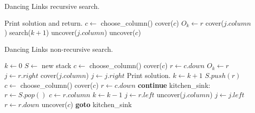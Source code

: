 \documentclass[a4paper]{article}
\begin{document}
\begin{algorithm}[p]
	\caption{Dancing Links recursive search.}
	\label{alg:search}
	\begin{distribalgo}[1]
				\STATE Print solution and return.  
			\ENDIF
			\STATE $c \leftarrow$ choose\_column()
			\STATE cover($c$)
				\STATE $O_k \leftarrow r$  
					\STATE cover($j.column$)
				\ENDFOR
				\STATE search($k + 1$)
					\STATE uncover($j.column$)
				\ENDFOR
			\ENDFOR
			\STATE uncover($c$)
		\ENDPROC
	\end{distribalgo}
\end{algorithm}


\begin{algorithm}[p]
	\caption{Dancing Links non-recursive search.}
	\label{alg:nrsearch}
	\begin{distribalgo}[1]
			\STATE $k \leftarrow 0$
			\STATE $S \leftarrow$ new stack
			\STATE $c \leftarrow$ choose\_column()
			\STATE cover($c$)
			\STATE $r \leftarrow c.down$
				\STATE $O_k \leftarrow r$  
				\STATE $j \leftarrow r.right$
					\STATE cover($j.column$)
					\STATE $j \leftarrow j.right$
				\ENDWHILE
					\STATE Print solution.  
				\ELSE
					\STATE $k \leftarrow k + 1$
					\STATE $S.push(r)$
					\STATE $c \leftarrow$ choose\_column()
					\STATE cover($c$)
					\STATE $r \leftarrow c.down$
					\STATE \textbf{continue}  
					\STATE kitchen\_sink:  
					\STATE $r \leftarrow S.pop()$
					\STATE $c \leftarrow r.column$
					\STATE $k \leftarrow k - 1$
				\ENDIF
				\STATE $j \leftarrow r.left$
					\STATE uncover($j.column$)
					\STATE $j \leftarrow j.left$
				\ENDWHILE
				\STATE $r \leftarrow r.down$
			\ENDWHILE
			\STATE uncover($c$)
				\STATE \textbf{goto} kitchen\_sink  
			\ENDIF
		\ENDPROC
	\end{distribalgo}
\end{algorithm}



\end{document}
